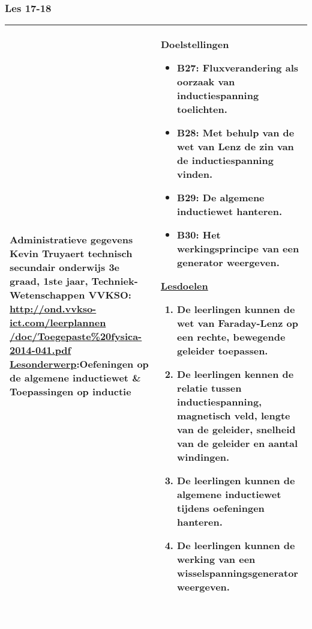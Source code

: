 


\begin{landscape}
	\subsubsection{Les 17-18}
	\begin{tabularx}{1.56\textwidth}{|p{}|X|}\hline
		\textbf{Administratieve gegevens}\newline\newline
		Kevin Truyaert\newline\newline
		technisch secundair onderwijs\newline
		3e graad, 1ste jaar, Techniek-Wetenschappen\newline
		VVKSO: \href{http://ond.vvkso-ict.com/leerplannen/doc/Toegepaste\%20fysica-2014-041.pdf}{http://ond.vvkso-ict.com/leerplannen /doc/Toegepaste\%20fysica-2014-041.pdf} \newline
		\underline{Lesonderwerp}:\newline Oefeningen op de algemene inductiewet \& Toepassingen op inductie & \textbf{Doelstellingen}
		\begin{itemize}[itemsep=0.08\baselineskip]
			\item B27: Fluxverandering als oorzaak van inductiespanning toelichten.
			\item B28: Met behulp van de wet van Lenz de zin van de inductiespanning vinden.
			\item B29: De algemene inductiewet hanteren.
			\item B30: Het werkingsprincipe van een generator weergeven.
		\end{itemize}
		\underline{Lesdoelen}\newline
		\vspace{-0.75cm}
		\begin{enumerate}[itemsep=0.08\baselineskip]
			\item De leerlingen kunnen de wet van Faraday-Lenz op een rechte, bewegende geleider toepassen.
			\item De leerlingen kennen de relatie tussen inductiespanning, magnetisch veld, lengte van de geleider, snelheid van de geleider en aantal windingen.
			\item De leerlingen kunnen de algemene inductiewet tijdens oefeningen hanteren.
			\item De leerlingen kunnen de werking van een wisselspanningsgenerator weergeven.
		\end{enumerate} \\\hline
	\end{tabularx}\vfill \textcolor{white}{.} 



\end{landscape}
